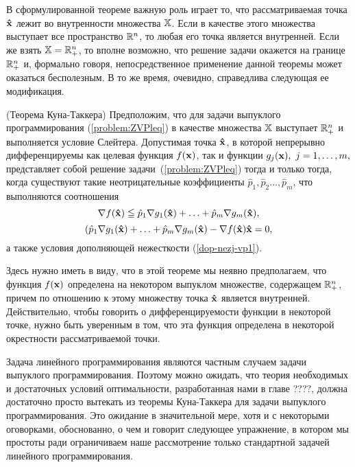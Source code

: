     В сформулированной теореме важную роль играет то, что
    рассматриваемая точка $\mathbf{\hat x}$ лежит во внутренности
    множества $\mathbb{X}$. Если в качестве этого множества выступает
    все пространство $\mathbb{R}^{n}$, то любая его точка является
    внутренней. Если же взять $\mathbb{X}=\mathbb{R}^{n}_{+}$, то вполне возможно, что
    решение задачи окажется на границе $\mathbb{R}^{n}_{+}$ и, формально
    говоря, непосредственное применение данной теоремы может
    оказаться бесполезным. В то же время, очевидно, справедлива
    следующая ее модификация.

\begin{teop}\label{Kuhn-T-Vip6}(Теорема Куна-Таккера)
    Предположим, что для задачи выпуклого программирования
    (\ref{problem:ZVPleq}) в качестве множества $\mathbb{X}$ выступает
    $\mathbb{R}^{n}_{+}$ и выполняется условие Слейтера.
    Допустимая точка $\mathbf{\hat x}$, в которой непрерывно дифференцируемы
    как целевая функция $f(\mathbf{x})$, так и функции $g_{j}(\mathbf{x}), \
    j=1,\ldots,m,$ представляет собой решение
    задачи~(\ref{problem:ZVPleq}) тогда и только тогда, когда существуют такие
    неотрицательные коэффициенты $\hat p_1, \hat p_2 \ldots, \hat p_m$,
    что выполняются соотношения
\[
    \nabla f(\mathbf{\hat{x}})\leqq
    \hat p_1 \nabla g_1(\mathbf{\hat{x}})+ \ldots + \hat p_m \nabla g_m(\mathbf{\hat{x}}),
\]
\[
    (\hat p_1 \nabla g_1(\mathbf{\hat{x}})+ \ldots + \hat p_m \nabla g_m(\mathbf{\hat{x}})
    -\nabla f(\mathbf{\hat{x}})\mathbf{\hat{x}}=0,
\]
    а также условия дополняющей нежесткости (\ref{dop-nezj-vp1}).
\end{teop}

    Здесь нужно иметь в виду, что в этой теореме мы неявно
    предполагаем, что функция $f(\mathbf{x})$ определена на некотором
    выпуклом множестве, содержащем $\mathbb{R}^{n}_{+}$, причем по отношению к этому множеству
    точка $\mathbf{\hat x}$ является внутренней. Действительно, чтобы
    говорить о дифференцируемости функции в некоторой точке, нужно
    быть уверенным в том, что эта функция определена в некоторой окрестности
    рассматриваемой точки.




    Задача линейного программирования являются частным случаем задачи выпуклого
    программирования. Поэтому можно ожидать, что теория необходимых
    и достаточных условий оптимальности, разработанная нами в главе
    ????, должна достаточно просто вытекать из теоремы Куна-Таккера
    для задачи выпуклого программирования. Это ожидание в
    значительной мере, хотя и с некоторыми оговорками, обоснованно,
    о чем и говорит следующее упражнение, в котором мы простоты ради ограничиваем
    наше рассмотрение только стандартной задачей линейного
    программирования.

